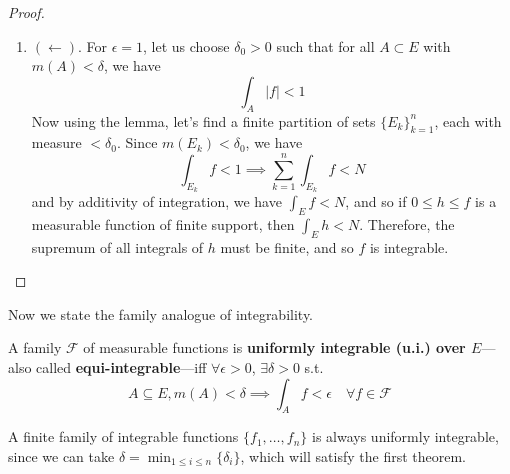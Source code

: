 \begin{proof}
\begin{enumerate}
      \item $(\leftarrow)$. For $\epsilon = 1$, let us choose $\delta_0 > 0$ such that for all $A \subset E$ with $m(A) < \delta$, we have
      \begin{equation}
        \int_A |f| < 1
      \end{equation}
      Now using the lemma, let's find a finite partition of sets $\{E_k\}_{k=1}^n$, each with measure $< \delta_0$. Since $m(E_k) < \delta_0$, we have 
      \begin{equation}
        \int_{E_k} f < 1 \implies \sum_{k=1}^n \int_{E_k} f < N
      \end{equation}
      and by additivity of integration, we have $\int_E f < N$, and so if $0 \leq h \leq f$ is a measurable function of finite support, then $\int_E h < N$. Therefore, the supremum of all integrals of $h$ must be finite, and so $f$ is integrable. 
    \end{enumerate}
  \end{proof}

  Now we state the family analogue of integrability. 

  \begin{definition}
    A family $\mathscr{F}$ of measurable functions is \textbf{uniformly integrable (u.i.) over $E$}---also called \textbf{equi-integrable}---iff $\forall \epsilon > 0$, $\exists \delta > 0$ s.t. 
    \begin{equation}
      A \subseteq E, m(A) < \delta \implies \int_A f < \epsilon \quad \forall f \in \mathscr{F}
    \end{equation}
  \end{definition}

  \begin{example}
    A finite family of integrable functions $\{f_1, \ldots, f_n\}$ is always uniformly integrable, since we can take $\delta = \min_{1 \leq i \leq n} \{\delta_i\}$, which will satisfy the first theorem. 
  \end{example}

